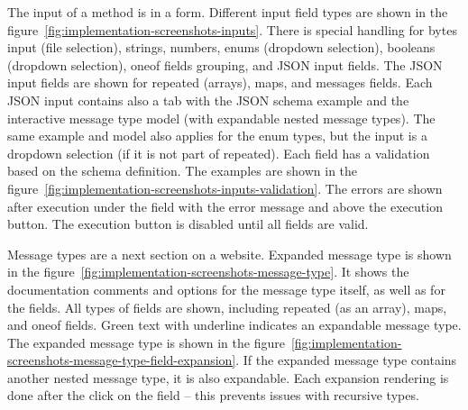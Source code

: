 The input of a method is in a form.
Different input field types are shown in the figure~\ref{fig:implementation-screenshots-inputs}.
There is special handling for bytes input (file selection), strings, numbers, enums (dropdown selection), booleans (dropdown selection), oneof fields grouping, and JSON input fields.
The JSON input fields are shown for repeated (arrays), maps, and messages fields.
Each JSON input contains also a tab with the JSON schema example and the interactive message type model (with expandable nested message types).
The same example and model also applies for the enum types, but the input is a dropdown selection (if it is not part of repeated).
Each field has a validation based on the schema definition.
The examples are shown in the figure~\ref{fig:implementation-screenshots-inputs-validation}.
The errors are shown after execution under the field with the error message and above the execution button.
The execution button is disabled until all fields are valid.


Message types are a next section on a website.
Expanded message type is shown in the figure~\ref{fig:implementation-screenshots-message-type}.
It shows the documentation comments and options for the message type itself, as well as for the fields.
All types of fields are shown, including repeated (as an array), maps, and oneof fields.
Green text with underline indicates an expandable message type.
The expanded message type is shown in the figure~\ref{fig:implementation-screenshots-message-type-field-expansion}.
If the expanded message type contains another nested message type, it is also expandable.
Each expansion rendering is done after the click on the field -- this prevents issues with recursive types.

